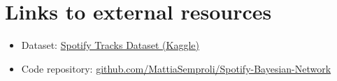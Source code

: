 \documentclass[letterpaper]{article}
\begin{document}
\section{Links to external resources}
\begin{itemize}
    \item Dataset: \href{https://www.kaggle.com/datasets/maharshipandya/-spotify-tracks-dataset}{Spotify Tracks Dataset (Kaggle)}
    \item Code repository: \href{https://github.com/MattiaSemproli/Spotify-Bayesian-Network}{github.com/MattiaSemproli/Spotify-Bayesian-Network}
\end{itemize}

\bigskip



\end{document}
